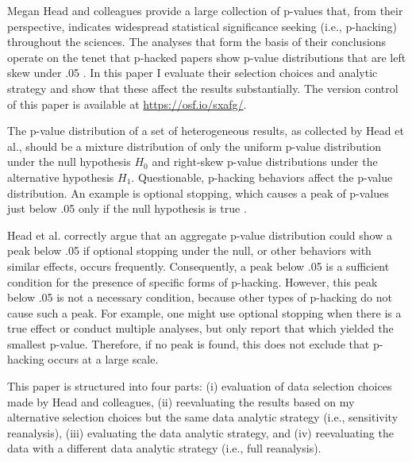 Megan Head and colleagues provide a large collection of p-values that, from their perspective, indicates widespread statistical significance seeking (i.e., p-hacking) throughout the sciences. The analyses that form the basis of their conclusions operate on the tenet that p-hacked papers show p-value distributions that are left skew under .05 \cite{Simonsohn2014}. In this paper I evaluate their selection choices and analytic strategy and show that these affect the results substantially. The version control of this paper is available at \href{https://osf.io/sxafg/}{https://osf.io/sxafg/}.

The p-value distribution of a set of heterogeneous results, as collected by Head et al., should be a mixture distribution of only the uniform p-value distribution under the null hypothesis $H_0$ and right-skew p-value distributions under the alternative hypothesis $H_1$. Questionable, p-hacking behaviors affect the p-value distribution. An example is optional stopping, which causes a peak of p-values just below .05 only if the null hypothesis is true \cite{Lakens_2014}.

Head et al. correctly argue that an aggregate p-value distribution could show a peak below .05 if optional stopping under the null, or other behaviors with similar effects, occurs frequently. Consequently, a peak below .05 is a sufficient condition for the presence of specific forms of p-hacking. However, this peak below .05 is not a necessary condition, because other types of p-hacking do not cause such a peak. For example, one might use optional stopping when there is a true effect \cite{Lakens_2014} or conduct multiple analyses, but only report that which yielded the smallest p-value. Therefore, if no peak is found, this does not exclude that p-hacking occurs at a large scale.  

This paper is structured into four parts: (i) evaluation of data selection choices made by Head and colleagues, (ii) reevaluating the results based on my alternative selection choices but the same data analytic strategy (i.e., sensitivity reanalysis), (iii) evaluating the data analytic strategy, and (iv) reevaluating the data with a different data analytic strategy (i.e., full reanalysis). 
  
  
